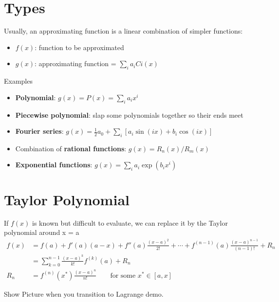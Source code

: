 \documentclass[12pt]{article}
\begin{document}
\section{Types}
Usually, an approximating function is a linear combination of
simpler functions:
%
\begin{itemize}
\item $f(x)$: function to be approximated
\item $g(x)$: approximating function = $\sum_i a_i Ci(x)$
\end{itemize}
%
Examples
%
\begin{itemize}
\item \textbf{Polynomial}: $g(x) = P(x) = \sum_i a_i x^i$

\item \textbf{Piecewise polynomial}: slap some polynomials together so their ends meet

\item \textbf{Fourier series}: $g(x) = \frac{1}{2} a_0 + \sum_i [a_i \sin(ix) + b_i \cos(ix)]$ %

\item Combination of \textbf{rational functions}: $g(x) = R_n(x)/R_m(x)$

\item \textbf{Exponential functions}: $g(x) = \sum_i a_i \exp(b_i x^i)$
\end{itemize}


\section{Taylor Polynomial}
If $f(x)$ is known but difficult to evaluate, we can replace it by the
Taylor polynomial around x = a
\begin{align}
f(x) &= f(a) + f'(a)(a-x) + f''(a)\frac{(x-a)^2}{2!} + \cdots + f^{(n-1)}(a)\frac{(x-a)^{n-1}}{(n-1)!} + R_n \\
%
  &= \sum_{k=0}^{n-1}\frac{(x-a)^k}{k!}f^{(k)}(a) + R_n \\
%
R_n &= f^{(n)}(x^*)\frac{(x-a)^{n}}{n!} \qquad \text{for some } x^* \in [a, x]
\end{align}

Show Picture when you transition to Lagrange demo.

\end{document}
